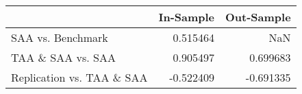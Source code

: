 \begin{tabular}{lrr}
\toprule
{} &  In-Sample &  Out-Sample \\
\midrule
SAA vs. Benchmark          &   0.515464 &         NaN \\
TAA \& SAA vs. SAA          &   0.905497 &    0.699683 \\
Replication vs. TAA \& SAA  &  -0.522409 &   -0.691335 \\
\bottomrule
\end{tabular}
